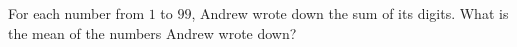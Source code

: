 For each number from $1$ to $99$, Andrew wrote down the sum of its digits. What is the mean of the numbers Andrew wrote down?
